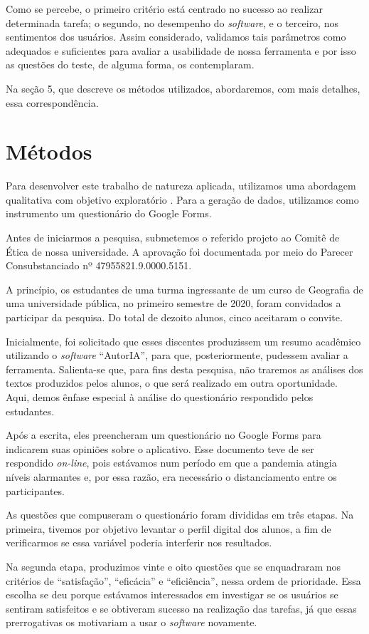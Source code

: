 \documentclass[portuguese]{textolivre}
\begin{document}
Como se percebe, o primeiro critério está centrado no sucesso ao realizar determinada tarefa; o segundo, no desempenho do \textit{software}, e o terceiro, nos sentimentos dos usuários. Assim considerado, validamos tais parâmetros como adequados e suficientes para avaliar a usabilidade de nossa ferramenta e por isso as questões do teste, de alguma forma, os contemplaram.

Na seção 5, que descreve os métodos utilizados, abordaremos, com mais detalhes, essa correspondência.


\section{Métodos}\label{sec-modelo}
Para desenvolver este trabalho de natureza aplicada, utilizamos uma abordagem qualitativa com objetivo exploratório \cite{paiva2019}. Para a geração de dados, utilizamos como instrumento um questionário do Google Forms.

Antes de iniciarmos a pesquisa, submetemos o referido projeto ao Comitê de Ética de nossa universidade. A aprovação foi documentada por meio do Parecer Consubstanciado nº 47955821.9.0000.5151.

A princípio, os estudantes de uma turma ingressante de um curso de Geografia de uma universidade pública, no primeiro semestre de 2020, foram convidados a participar da pesquisa. Do total de dezoito alunos, cinco aceitaram o convite.

Inicialmente, foi solicitado que esses discentes produzissem um resumo acadêmico utilizando o \textit{software} “AutorIA”, para que, posteriormente, pudessem avaliar a ferramenta. Salienta-se que, para fins desta pesquisa, não traremos as análises dos textos produzidos pelos alunos, o que será realizado em outra oportunidade. Aqui, demos ênfase especial à análise do questionário respondido pelos estudantes.

Após a escrita, eles preencheram um questionário no Google Forms para indicarem suas opiniões sobre o aplicativo. Esse documento teve de ser respondido \textit{on-line}, pois estávamos num período em que a pandemia atingia níveis alarmantes e, por essa razão, era necessário o distanciamento entre os participantes.

As questões que compuseram o questionário foram divididas em três etapas. Na primeira, tivemos por objetivo levantar o perfil digital dos alunos, a fim de verificarmos se essa variável poderia interferir nos resultados.

Na segunda etapa, produzimos vinte e oito questões que se enquadraram nos critérios de “satisfação”, “eficácia” e “eficiência”, nessa ordem de prioridade. Essa escolha se deu porque estávamos interessados em investigar se os usuários se sentiram satisfeitos e se obtiveram sucesso na realização das tarefas, já que essas prerrogativas os motivariam a usar o \textit{software} novamente.
\end{document}
